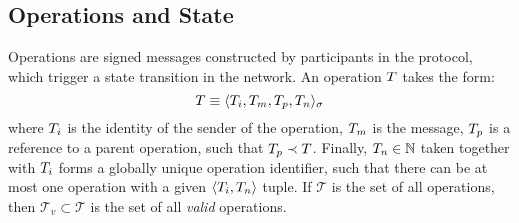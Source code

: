 
\subsection{Operations and State}
\label{operations-and-state}



Operations are signed messages constructed by participants in the protocol,
which trigger a state transition in the network. An operation $T$ takes
the form:
\[
    T \equiv \langle T_i, T_m, T_p, T_n \rangle_{\sigma}
\]
where $T_i$ is the identity of the sender of the operation, $T_m$ is the
message, $T_p$ is a reference to a parent operation, such that $T_p \prec
T$. Finally, $T_n \in \mathbb{N}$ taken together with $T_i$ forms a
globally unique operation identifier, such that there can be at most one
operation with a given $\langle T_i, T_n \rangle$ tuple. If $\mathcal{T}$ is the
set of all operations, then $\mathcal{T}_v \subset \mathcal{T}$ is the set of all \emph{valid}
operations.

